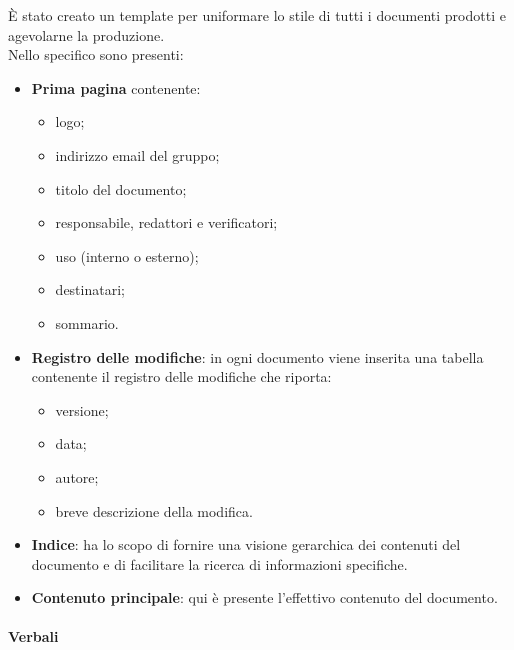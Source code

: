È stato creato un template per uniformare lo stile di tutti i documenti prodotti e agevolarne la produzione.\\
Nello specifico sono presenti:
\begin{itemize}
    \item \textbf{Prima pagina} contenente:
          \begin {itemize}
    \item logo;
    \item indirizzo email del gruppo;
    \item titolo del documento;
    \item responsabile, redattori e verificatori;
    \item uso (interno o esterno);
    \item destinatari;
    \item sommario.
\end{itemize}
\item \textbf{Registro delle modifiche}: in ogni documento viene inserita una tabella contenente il registro delle modifiche che riporta:
\begin{itemize}
    \item versione;
    \item data;
    \item autore;
    \item breve descrizione della modifica.
\end{itemize}
\item \textbf{Indice}: ha lo scopo di fornire una visione gerarchica dei contenuti del documento e di facilitare la ricerca di informazioni specifiche.
\item \textbf{Contenuto principale}: qui è presente l'effettivo contenuto del documento.
\end{itemize}

\paragraph{Verbali} ~

